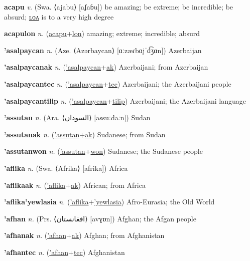 \textbf{\hypertarget{acapu}{acapu}} \textit{v.} (Swa. ⟨ajabu⟩ [aʄaɓu])
be amazing; be extreme; be incredible; be absurd; \hyperlink{acapulon}{ʟᴏᴧ} is to a very high degree

\textbf{\hypertarget{acapulon}{acapulon}} \textit{n.} (\hyperlink{acapu}{acapu}+\allowbreak \hyperlink{lon}{lon})
amazing; extreme; incredible; absurd

\textbf{\hypertarget{'asalpaycan}{'asalpaycan}} \textit{n.} (Aze. ⟨Azərbaycan⟩ [ɑːzæɾbɑjˈd͡ʒɑn])
Azerbaijan

\textbf{\hypertarget{'asalpaycanak}{'asalpaycanak}} \textit{n.} (\hyperlink{'asalpaycan}{'asalpaycan}+\allowbreak \hyperlink{ak}{ak})
Azerbaijani; from Azerbaijan

\textbf{\hypertarget{'asalpaycantec}{'asalpaycantec}} \textit{n.} (\hyperlink{'asalpaycan}{'asalpaycan}+\allowbreak \hyperlink{tec}{tec})
Azerbaijani; the Azerbaijani people

\textbf{\hypertarget{'asalpaycantilip}{'asalpaycantilip}} \textit{n.} (\hyperlink{'asalpaycan}{'asalpaycan}+\allowbreak \hyperlink{tilip}{tilip})
Azerbaijani; the Azerbaijani language

\textbf{\hypertarget{'assutan}{'assutan}} \textit{n.} (Ara. ⟨{\arabics{}السودان‎}⟩ [assuːdaːn])
Sudan

\textbf{\hypertarget{'assutanak}{'assutanak}} \textit{n.} (\hyperlink{'assutan}{'assutan}+\allowbreak \hyperlink{ak}{ak})
Sudanese; from Sudan

\textbf{\hypertarget{'assutanwon}{'assutanwon}} \textit{n.} (\hyperlink{'assutan}{'assutan}+\allowbreak \hyperlink{won}{won})
Sudanese; the Sudanese people

\textbf{\hypertarget{'aflika}{'aflika}} \textit{n.} (Swa. ⟨Afrika⟩ [afrika])
Africa

\textbf{\hypertarget{'aflikaak}{'aflikaak}} \textit{n.} (\hyperlink{'aflika}{'aflika}+\allowbreak \hyperlink{ak}{ak})
African; from Africa

\textbf{\hypertarget{'aflika'yewlasia}{'aflika'yewlasia}} \textit{n.} (\hyperlink{'aflika}{'aflika}+\allowbreak \hyperlink{'yewlasia}{'yewlasia})
Afro-Eurasia; the Old World

\textbf{\hypertarget{'afhan}{'afhan}} \textit{n.} (Prs. ⟨{\arabics{}افغانستان‬}⟩ [avɣɒn])
Afghan; the Afgan people

\textbf{\hypertarget{'afhanak}{'afhanak}} \textit{n.} (\hyperlink{'afhan}{'afhan}+\allowbreak \hyperlink{ak}{ak})
Afghan; from Afghanistan

\textbf{\hypertarget{'afhantec}{'afhantec}} \textit{n.} (\hyperlink{'afhan}{'afhan}+\allowbreak \hyperlink{tec}{tec})
Afghanistan

